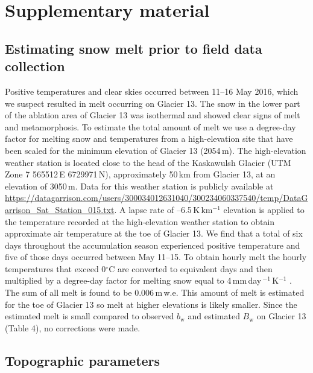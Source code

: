 \documentclass[onecolumn, letterpaper]{igs}
\begin{document}
\title[Estimating winter balance and its uncertainty]{}
\author[Pulwicki and others, 2018]{}
  
\section*{Supplementary material}


\subsection*{Estimating snow melt prior to field data collection}

Positive temperatures and clear skies occurred between 11--16 May 2016, which we suspect resulted in melt occurring on Glacier 13. The snow in the lower part of the ablation area of Glacier 13 was isothermal and showed clear signs of melt and metamorphosis. To estimate the total amount of melt we use a degree-day factor for melting snow \citep{Braithwaite2008} and temperatures from a high-elevation site that have been scaled for the minimum elevation of Glacier 13 (2054\,m). The high-elevation weather station is located close to the head of the Kaskawulsh Glacier (UTM Zone 7 565512\,E 6729971\,N), approximately 50\,km from Glacier 13, at an elevation of 3050\,m. Data for this weather station is publicly available at \url{https://datagarrison.com/users/300034012631040/300234060337540/temp/DataGarrison_Sat_Station_015.txt}. A lapse rate of --6.5\,K\,km$^{-1}$ elevation is applied to the temperature recorded at the high-elevation weather station to obtain approximate air temperature at the toe of Glacier 13. We find that a total of six days throughout the accumulation season experienced positive temperature and five of those days occurred between May 11--15. To obtain hourly melt the hourly temperatures that exceed 0$^{\circ}$C are converted to equivalent days and then multiplied by a degree-day factor for melting snow equal to 4\,mm\,day\,$^{-1}$\,K$^{-1}$ \citep{Braithwaite2008}. The sum of all melt is found to be 0.006\,m\,w.e. This amount of melt is estimated for the toe of Glacier 13 so melt at higher elevations is likely smaller.  Since the estimated melt is small compared to observed $b_\mathrm{w}$ and estimated $B_\mathrm{w}$ on Glacier 13 (Table 4), no corrections were made. 


\subsection*{Topographic parameters}
\end{document}
